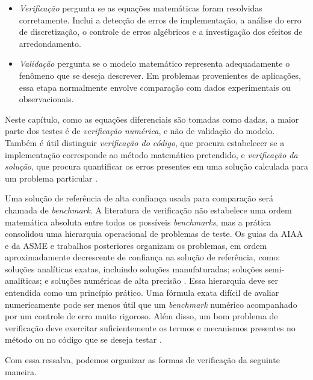 \begin{itemize}
\item \emph{Verificação} pergunta se as equações matemáticas foram resolvidas corretamente. Inclui a detecção de erros de implementação, a análise do erro de discretização, o controle de erros algébricos e a investigação dos efeitos de arredondamento.
\item \emph{Validação} pergunta se o modelo matemático representa adequadamente o fenômeno que se deseja descrever. Em problemas provenientes de aplicações, essa etapa normalmente envolve comparação com dados experimentais ou observacionais.
\end{itemize}

Neste capítulo, como as equações diferenciais são tomadas como dadas, a maior parte dos testes é de \emph{verificação numérica}, e não de validação do modelo. Também é útil distinguir \emph{verificação do código}, que procura estabelecer se a implementação corresponde ao método matemático pretendido, e \emph{verificação da solução}, que procura quantificar os erros presentes em uma solução calculada para um problema particular \cite{Roy2005Verification,OberkampfRoy2025}.

Uma solução de referência de alta confiança usada para comparação será chamada de {\it benchmark}. A literatura de verificação não estabelece uma ordem matemática absoluta entre todos os possíveis {\it benchmarks}, mas a prática consolidou uma hierarquia operacional de problemas de teste. Os guias da AIAA e da ASME e trabalhos posteriores organizam os problemas, em ordem aproximadamente decrescente de confiança na solução de referência, como: soluções analíticas exatas, incluindo soluções manufaturadas; soluções semi-analíticas; e soluções numéricas de alta precisão \cite{AIAA1998VV,ASMEVV10,Anderson2007VV,OberkampfTrucano2008,AIAA2024Code}. Essa hierarquia deve ser entendida como um princípio prático. Uma fórmula exata difícil de avaliar numericamente pode ser menos útil que um {\it benchmark} numérico acompanhado por um controle de erro muito rigoroso. Além disso, um bom problema de verificação deve exercitar suficientemente os termos e mecanismos presentes no método ou no código que se deseja testar \cite{Roache2002MMS,KnuppSalari2003}.

Com essa ressalva, podemos organizar as formas de verificação da seguinte maneira.

